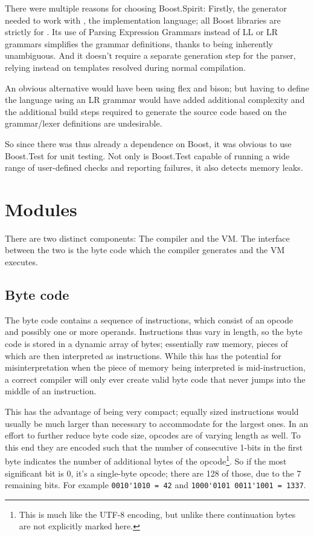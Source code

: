 		There were multiple reasons for choosing Boost.Spirit: Firstly, the generator needed to work with {\CC}, the implementation language; all Boost libraries are strictly for {\CC}. Its use of Parsing Expression Grammars instead of LL or LR grammars simplifies the grammar definitions, thanks to being inherently unambiguous. And it doesn't require a separate generation step for the parser, relying instead on {\CC} templates resolved during normal compilation.
		
		An obvious alternative would have been using flex and bison; but having to define the language using an LR grammar would have added additional complexity and the additional build steps required to generate the source code based on the grammar/lexer definitions are undesirable.
		
		So since there was thus already a dependence on Boost, it was obvious to use Boost.Test for unit testing. Not only is Boost.Test capable of running a wide range of user-defined checks and reporting failures, it also detects memory leaks.
	
	
	\section{Modules}
	
		
		There are two distinct components: The compiler and the VM. The interface between the two is the byte code which the compiler generates and the VM executes.
		
		\subsection{Byte code}
			
			The byte code contains a sequence of instructions, which consist of an opcode and possibly one or more operands. Instructions thus vary in length, so the byte code is stored in a dynamic array of bytes; essentially raw memory, pieces of which are then interpreted as instructions. While this has the potential for misinterpretation when the piece of memory being interpreted is mid-instruction, a correct compiler will only ever create valid byte code that never jumps into the middle of an instruction.
			
			This has the advantage of being very compact; equally sized instructions would usually be much larger than necessary to accommodate for the largest ones. In an effort to further reduce byte code size, opcodes are of varying length as well. To this end they are encoded such that the number of consecutive 1-bits in the first byte indicates the number of additional bytes of the opcode\footnote{This is much like the UTF-8 encoding, but unlike there continuation bytes are not explicitly marked here.}. So if the most significant bit is 0, it's a single-byte opcode; there are 128 of those, due to the 7 remaining bits. For example \lstinline$0010'1010 = 42$ and \lstinline$1000'0101 0011'1001 = 1337$.
			
